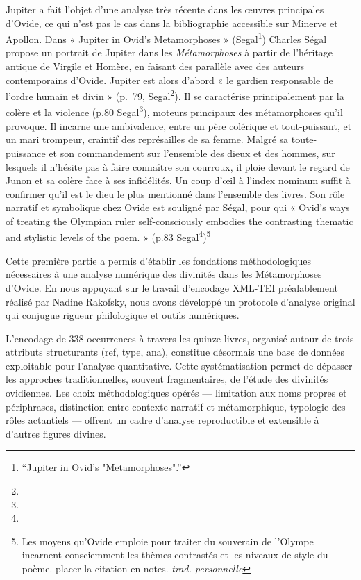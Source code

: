 \documentclass[
  letterpaper,
  DIV=11,
  numbers=noendperiod]{scrreprt}
\begin{document}
Jupiter a fait l'objet d'une analyse très récente dans les œuvres
principales d'Ovide, ce qui n'est pas le cas dans la bibliographie
accessible sur Minerve et Apollon. Dans « Jupiter in Ovid's
Metamorphoses » (Segal\footnote{{``Jupiter in Ovid's "Metamorphoses".''}})
Charles Ségal propose un portrait de Jupiter dans les
\emph{Métamorphoses} à partir de l'héritage antique de Virgile et
Homère, en faisant des parallèle avec des auteurs contemporains d'Ovide.
Jupiter est alors d'abord « le gardien responsable de l'ordre humain et
divin » (p.~79, Segal\footnote{}). Il se caractérise principalement par
la colère et la violence (p.80 Segal\footnote{}), moteurs principaux des
métamorphoses qu'il provoque. Il incarne une ambivalence, entre un père
colérique et tout-puissant, et un mari trompeur, craintif des
représailles de sa femme. Malgré sa toute-puissance et son commandement
sur l'ensemble des dieux et des hommes, sur lesquels il n'hésite pas à
faire connaître son courroux, il ploie devant le regard de Junon et sa
colère face à ses infidélités. Un coup d'œil à l'index nominum suffit à
confirmer qu'il est le dieu le plus mentionné dans l'ensemble des
livres. Son rôle narratif et symbolique chez Ovide est souligné par
Ségal, pour qui « Ovid's ways of treating the Olympian ruler
self-consciously embodies the contrasting thematic and stylistic levels
of the poem. » (p.83 Segal\footnote{})\footnote{Les moyens qu'Ovide
  emploie pour traiter du souverain de l'Olympe incarnent consciemment
  les thèmes contrastés et les niveaux de style du poème. placer la
  citation en notes. \emph{trad. personnelle}}

Cette première partie a permis d'établir les fondations méthodologiques
nécessaires à une analyse numérique des divinités dans les Métamorphoses
d'Ovide. En nous appuyant sur le travail d'encodage XML-TEI
préalablement réalisé par Nadine Rakofsky, nous avons développé un
protocole d'analyse original qui conjugue rigueur philologique et outils
numériques.

L'encodage de 338 occurrences à travers les quinze livres, organisé
autour de trois attributs structurants (ref, type, ana), constitue
désormais une base de données exploitable pour l'analyse quantitative.
Cette systématisation permet de dépasser les approches traditionnelles,
souvent fragmentaires, de l'étude des divinités ovidiennes. Les choix
méthodologiques opérés --- limitation aux noms propres et périphrases,
distinction entre contexte narratif et métamorphique, typologie des
rôles actantiels --- offrent un cadre d'analyse reproductible et
extensible à d'autres figures divines.
\end{document}

